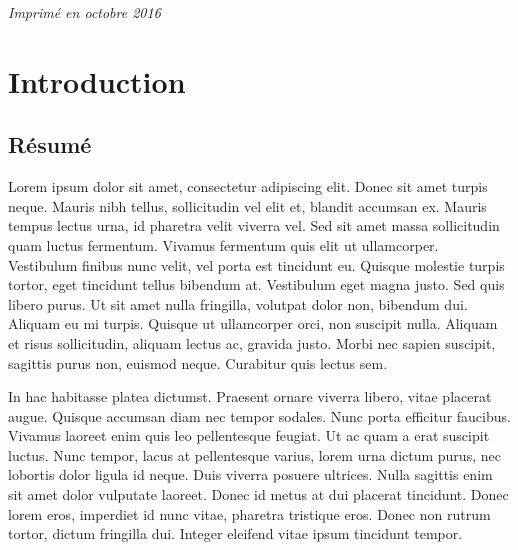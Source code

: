 \documentclass[12pt,fleqn,oneside,openany]{book} %
\begin{document}
\noindent \textit{Imprimé en octobre 2016} 



\pagestyle{empty} %

\tableofcontents %


\pagestyle{fancy} %



\chapter{Introduction} \label{cha:introduction}

\section*{Résumé}


Lorem ipsum dolor sit amet, consectetur adipiscing elit. Donec sit amet turpis neque. Mauris nibh tellus, sollicitudin vel elit et, blandit accumsan ex. Mauris tempus lectus urna, id pharetra velit viverra vel. Sed sit amet massa sollicitudin quam luctus fermentum. Vivamus fermentum quis elit ut ullamcorper. Vestibulum finibus nunc velit, vel porta est tincidunt eu. Quisque molestie turpis tortor, eget tincidunt tellus bibendum at. Vestibulum eget magna justo. Sed quis libero purus. Ut sit amet nulla fringilla, volutpat dolor non, bibendum dui. Aliquam eu mi turpis. Quisque ut ullamcorper orci, non suscipit nulla. Aliquam et risus sollicitudin, aliquam lectus ac, gravida justo. Morbi nec sapien suscipit, sagittis purus non, euismod neque. Curabitur quis lectus sem.

In hac habitasse platea dictumst. Praesent ornare viverra libero, vitae placerat augue. Quisque accumsan diam nec tempor sodales. Nunc porta efficitur faucibus. Vivamus laoreet enim quis leo pellentesque feugiat. Ut ac quam a erat suscipit luctus. Nunc tempor, lacus at pellentesque varius, lorem urna dictum purus, nec lobortis dolor ligula id neque. Duis viverra posuere ultrices. Nulla sagittis enim sit amet dolor vulputate laoreet. Donec id metus at dui placerat tincidunt. Donec lorem eros, imperdiet id nunc vitae, pharetra tristique eros. Donec non rutrum tortor, dictum fringilla dui. Integer eleifend vitae ipsum tincidunt tempor.
\end{document}
